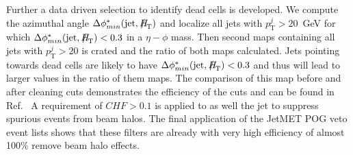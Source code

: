 
Further a data driven selection to identify dead cells is developed. We compute the azimuthal angle $\Delta \phi^*_{min} (\textrm{jet},\htmiss)$ and localize all jets with $p_\textrm{T}^j>20$~GeV for which $\Delta \phi^*_{min} (\textrm{jet},\htmiss)<0.3$ in a $\eta - \phi$ mass. Then second maps containing all jets with  $p_\textrm{T}^j>20$ is crated and the ratio of both maps calculated.  Jets pointing towards dead cells are likely to have $\Delta \phi^*_{min} (\textrm{jet},\htmiss)<0.3$ and thus will lead to larger values in the ratio of them maps. The comparison of this map before and after cleaning cuts demonstrates the efficiency of the cuts and can be found in Ref.~\cite{alphaTnote} A requirement of $CHF > 0.1$ is applied to as well the jet to suppress spurious events from beam halos. The final application of the JetMET POG veto event lists shows that these filters are already with very high efficiency of almost 100\% remove beam halo effects.

